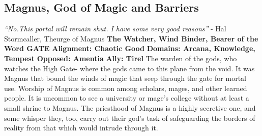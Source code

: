 \subsection{Magnus, God of Magic and Barriers}\label{god:magnus}
\textit{“No.This portal will remain shut. I have some very good reasons”}
\break
\hspace*{\fill} - Hal Stormcaller, Theurge of Magnus
\break
\break
\textbf{The Watcher, Wind Binder, Bearer of the Word GATE}\break
\hspace*{\fill}\break
\textbf{Alignment:\hspace*{\fill} Chaotic Good} \break
\textbf{Domains:\hspace*{\fill} Arcana, Knowledge, Tempest} \break
\textbf{Opposed:\hspace*{\fill} Amentia} \break
\textbf{Ally:\hspace*{\fill} Tirel} \break
\hspace*{\fill}\break
The warden of the gods, who watches the High Gate- where the gods came to this plane from the void. It was Magnus that bound the winds of magic that seep through the gate for mortal use.\newline
Worship of Magnus is common among scholars, mages, and other learned people. It is uncommon to see a university or mage’s college without at least a small shrine to Magnus.\newline
The priesthood of Magnus is a highly secretive one, and some whisper they, too, carry out their god’s task of safeguarding the borders of reality from that which would intrude through it.\newline

